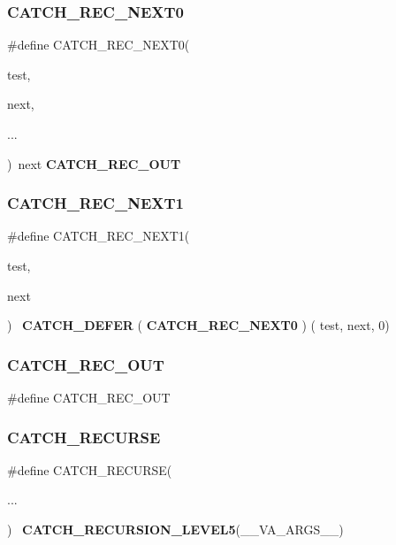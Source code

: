 \mbox{\label{catch_8hpp_ae25889c34b72704724f5797b6103c463}} 
\subsubsection{CATCH\_REC\_NEXT0}
{\footnotesize\ttfamily \#define C\+A\+T\+C\+H\+\_\+\+R\+E\+C\+\_\+\+N\+E\+X\+T0(\begin{DoxyParamCaption}\item[{}]{test,  }\item[{}]{next,  }\item[{}]{... }\end{DoxyParamCaption})~next \textbf{ C\+A\+T\+C\+H\+\_\+\+R\+E\+C\+\_\+\+O\+UT}}

\mbox{\label{catch_8hpp_a0ddf3b75cc3780765a2cb551d6536721}} 
\subsubsection{CATCH\_REC\_NEXT1}
{\footnotesize\ttfamily \#define C\+A\+T\+C\+H\+\_\+\+R\+E\+C\+\_\+\+N\+E\+X\+T1(\begin{DoxyParamCaption}\item[{}]{test,  }\item[{}]{next }\end{DoxyParamCaption})~\textbf{ C\+A\+T\+C\+H\+\_\+\+D\+E\+F\+ER} ( \textbf{ C\+A\+T\+C\+H\+\_\+\+R\+E\+C\+\_\+\+N\+E\+X\+T0} ) ( test, next, 0)}

\mbox{\label{catch_8hpp_ab469d9696504fd14e36fd1d8b6e47b7f}} 
\subsubsection{CATCH\_REC\_OUT}
{\footnotesize\ttfamily \#define C\+A\+T\+C\+H\+\_\+\+R\+E\+C\+\_\+\+O\+UT}

\mbox{\label{catch_8hpp_ae3ce5d9c8e50eba755111a19a62432e5}} 
\subsubsection{CATCH\_RECURSE}
{\footnotesize\ttfamily \#define C\+A\+T\+C\+H\+\_\+\+R\+E\+C\+U\+R\+SE(\begin{DoxyParamCaption}\item[{}]{... }\end{DoxyParamCaption})~\textbf{ C\+A\+T\+C\+H\+\_\+\+R\+E\+C\+U\+R\+S\+I\+O\+N\+\_\+\+L\+E\+V\+E\+L5}(\+\_\+\+\_\+\+V\+A\+\_\+\+A\+R\+G\+S\+\_\+\+\_\+)}

